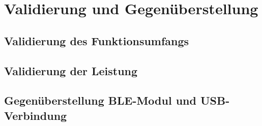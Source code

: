 
\chapter{Validierung und Gegenüberstellung}

\section{Validierung des Funktionsumfangs}
\lipsum[1]

\section{Validierung der Leistung}
\lipsum[1]

\section{Gegenüberstellung BLE-Modul und USB-Verbindung}
\lipsum[1]